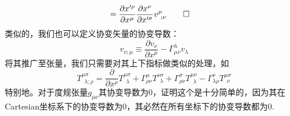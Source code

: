 \documentclass[a4paper]{book}
\makeatletter
\renewcommand{\proofname}{\indent\bf 证明}%
\renewenvironment{proof}[1][\proofname]{\par
	\pushQED{\qed}%
	\normalfont \topsep6\p@\@plus6\p@\relax
	\trivlist
	\item[\hskip\labelsep
	\itshape
	#1\@addpunct{}]\ignorespaces
}{%
	\popQED\endtrivlist\@endpefalse
}
\makeatother
\begin{document}
\begin{appendix}
\begin{proof}
\begin{align}
={}& \frac{\partial x'^{\rho}}{\partial x^{\mu}} \frac{\partial x^{\nu}}{\partial x'^{\sigma}}v^{\mu}_{~;\nu} \notag \qedhere
\end{align}
\end{proof}
类似的，我们也可以定义协变矢量的协变导数：
\begin{equation}
	v_{\nu;\mu}\equiv \frac{\partial v_{\nu}}{\partial x^{\mu}}-\Gamma^{\lambda}_{\mu \nu}v_{\lambda}
\end{equation}
将其推广至张量，我们只需要对其上下指标做类似的处理，如
\begin{equation}
	T^{\mu \sigma}_{~~\lambda ;\rho}=\frac{\partial}{\partial x^{\rho}}	T^{\mu \sigma}_{~~\lambda }+\Gamma^{\mu }_{\rho \nu }T^{\nu \sigma}_{~~\lambda }+\Gamma^{\sigma }_{\rho \nu }T^{\mu \nu}_{~~\lambda }-\Gamma^{\nu }_{\lambda \rho }T^{\mu \sigma}_{~~\nu }
\end{equation}
特别地。对于度规张量$g_{\mu \nu}$其协变导数为0，证明这个是十分简单的，因为其在Cartesian坐标系下的协变导数为0，其必然在所有坐标下的协变导数都为0.

\end{appendix}
\end{document}
